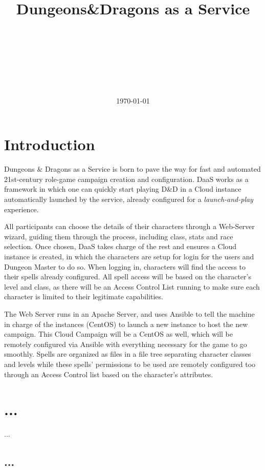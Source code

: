 \documentclass[a4paper,12pt]{report}
\title{Dungeons\&Dragons as a Service}
\author{\Large \firstauthor\\\Large \secondauthor\\\thirdauthor\\\fourthauthor\\\mbox{}\\\mbox{}\\\docversion}
\date{\today}
\begin{document}
\renewcommand{\thepage}{\roman{page}}
\maketitle
\tableofcontents
{}

\chapter{Introduction}
\setcounter{page}{1}
\renewcommand{\thepage}{\arabic{page}}

Dungeons \& Dragons as a Service is born to pave the way for fast and automated 21st-century role-game campaign creation and configuration. DaaS works as a framework in which one can quickly start playing D\&D in a Cloud instance automatically launched by the service, already configured for a \textit{launch-and-play} experience. 

All participants can choose the details of their characters through a Web-Server wizard, guiding them through the process, including class, stats and race selection. Once chosen, DaaS takes charge of the rest and ensures a Cloud instance is created, in which the characters are setup for login for the users and Dungeon Master to do so. When logging in, characters will find the access to their spells already configured. All spell access will be based on the character's level and class, as there will be an Access Control List running to make sure each character is limited to their legitimate capabilities.

The Web Server runs in an Apache Server, and uses Ansible to tell the machine in charge of the instances (CentOS) to launch a new instance to host the new campaign. This Cloud Campaign will be a CentOS as well, which will be remotely configured via Ansible with everything necessary for the game to go smoothly. Spells are organized as files in a file tree separating character classes and levels while these spells' permissions to be used are remotely configured too through an Access Control list based on the character's attributes.

%

\chapter{...}
\label{ch:}

...

\section{...}
\label{sec:}
\end{document}
